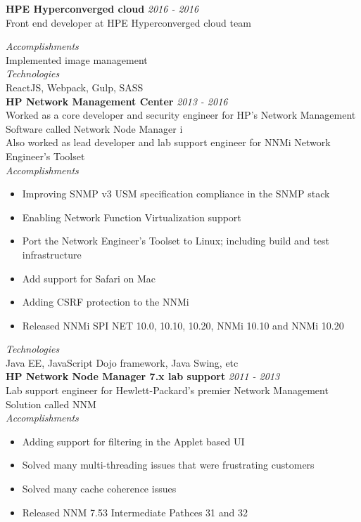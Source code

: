 \documentclass[line,margin]{res}
\begin{document}
\begin{resume}
{\bf HPE Hyperconverged cloud} \hfill {\it{2016 - 2016}}\\
Front end developer at HPE Hyperconverged cloud team

{\it{Accomplishments}}\\
Implemented image management\\

{\it{Technologies}}\\
ReactJS, Webpack, Gulp, SASS\\


{\bf HP Network Management Center} \hfill {\it{2013 - 2016}}\\
Worked as a core developer and security engineer for HP's Network Management Software called Network Node Manager i\\
Also worked as lead developer and lab support engineer for NNMi Network Engineer's Toolset\\

{\it{Accomplishments}}\\
\begin{itemize}
\item Improving SNMP v3 USM specification compliance in the SNMP stack
\item Enabling Network Function Virtualization support
\item Port the Network Engineer's Toolset to Linux; including build and test infrastructure
\item Add support for Safari on Mac
\item Adding CSRF protection to the NNMi
\item Released NNMi SPI NET 10.0, 10.10, 10.20, NNMi 10.10 and NNMi 10.20
\end{itemize}

{\it{Technologies}}\\
Java EE, JavaScript Dojo framework, Java Swing, etc\\

{\bf HP Network Node Manager 7.x lab support} \hfill {\it{2011 - 2013}}\\
Lab support engineer for Hewlett-Packard's premier Network Management Solution called NNM\\

{\it{Accomplishments}}\\
\begin{itemize}
\item Adding support for filtering in the Applet based UI
\item Solved many multi-threading issues that were frustrating customers
\item Solved many cache coherence issues
\item Released NNM 7.53 Intermediate Pathces 31 and 32
\end{itemize}



\end{resume}
\end{document}

